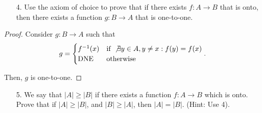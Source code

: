 \documentclass[10pt]{article}
\theoremstyle{definition}
\theoremstyle{plain}
\begin{document}
\pagebreak



\begin{enumerate}
\item[4.] Use the axiom of choice to prove that if there exists $f:A \to B$ that is onto, then there exists a function $g:B \to A$ that is one-to-one.
\end{enumerate}

\begin{proof}
Consider $g:B\to A$ such that
$$g=
\begin{cases}
f^{-1}(x) &\text{if }\not\exists y\in A,y\neq x: f(y)=f(x) \\
\text{DNE} &\text{otherwise}
\end{cases}.$$

Then, $g$ is one-to-one.
\end{proof}

\begin{enumerate}
\item[5.] We say that $|A| \geq |B|$ if there exists a function $f:A \to B$ which is onto.  Prove that if $|A| \geq |B|$, and $|B| \geq |A|$, then $|A| = |B|$.  (Hint:  Use 4).
\end{enumerate}
\end{document}
